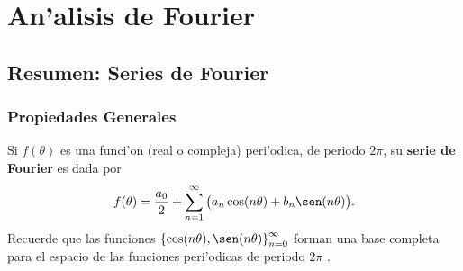 \chapter{An'alisis de Fourier}
\setcounter{page}{1}


\section{Resumen: Series de Fourier}

\subsection{Propiedades Generales} Si $f(\theta)$ es una funci'on (real o compleja) peri'odica, de periodo $2\pi$, su \textbf{serie de Fourier} es dada por
\begin{equation}\label{sf1}
 f(\theta) =\frac{a_0}{2}  +\sum_{n=1}^\infty 
\big(a_n\cos(n\theta) + b_n\sen(n\theta)\big).
\end{equation}
Recuerde que las funciones $\left\lbrace\cos(n\theta),\sen(n\theta)\right\rbrace_{n=0}^{\infty}$ forman una base completa para el espacio de las funciones peri'odicas de periodo $2\pi$ \cite{Arfken}.

